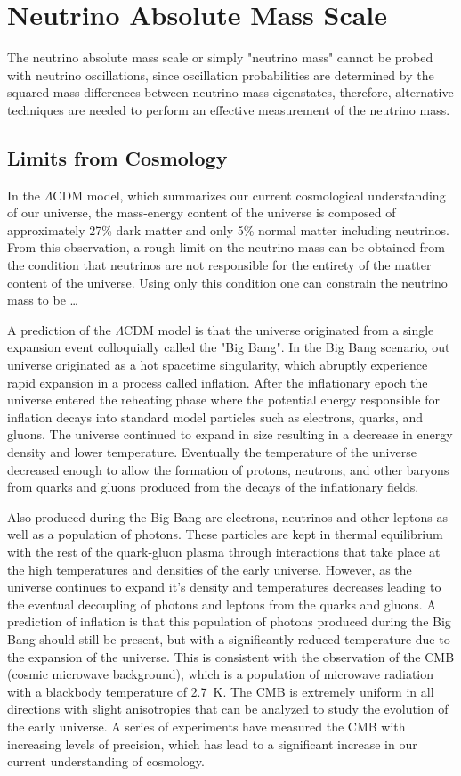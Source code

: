 \section{Neutrino Absolute Mass Scale}

The neutrino absolute mass scale or simply "neutrino mass" cannot be probed with neutrino oscillations, since oscillation probabilities are determined by the squared mass differences between neutrino mass eigenstates, therefore, alternative techniques are needed to perform an effective measurement of the neutrino mass.

\subsection{Limits from Cosmology}

In the $\Lambda$CDM model, which summarizes our current cosmological understanding of our universe, the mass-energy content of the universe is composed of approximately 27\% dark matter and only 5\% normal matter including neutrinos. From this observation, a rough limit on the neutrino mass can be obtained from the condition that neutrinos are not responsible for the entirety of the matter content of the universe. Using only this condition one can constrain the neutrino mass to be \ldots

A prediction of the $\Lambda$CDM model is that the universe originated from a single expansion event colloquially called the "Big Bang". In the Big Bang scenario, out universe originated as a hot spacetime singularity, which abruptly experience rapid expansion in a process called inflation. After the inflationary epoch the universe entered the reheating phase where the potential energy responsible for inflation decays into standard model particles such as electrons, quarks, and gluons. The universe continued to expand in size resulting in a decrease in energy density and lower temperature. Eventually the temperature of the universe decreased enough to allow the formation of protons, neutrons, and other baryons from quarks and gluons produced from the decays of the inflationary fields.

Also produced during the Big Bang are electrons, neutrinos and other leptons as well as a population of photons. These particles are kept in thermal equilibrium with the rest of the quark-gluon plasma through interactions that take place at the high temperatures and densities of the early universe. However, as the universe continues to expand it's density and temperatures decreases leading to the eventual decoupling of photons and leptons from the quarks and gluons. A prediction of inflation is that this population of photons produced during the Big Bang should still be present, but with a significantly reduced temperature due to the expansion of the universe. This is consistent with the observation of the CMB (cosmic microwave background), which is a population of microwave radiation with a blackbody temperature of 2.7~K. The CMB is extremely uniform in all directions with slight anisotropies that can be analyzed to study the evolution of the early universe. A series of experiments have measured the CMB with increasing levels of precision, which has lead to a significant increase in our current understanding of cosmology.

